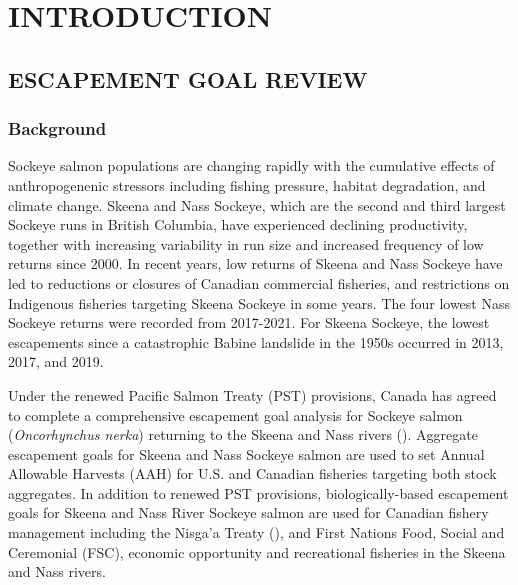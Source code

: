 \documentclass[french,11pt]{book}
\begin{document}
\endgroup{} \endgroup{}

\clearpage

\section{INTRODUCTION}\label{introduction}

\subsection{ESCAPEMENT GOAL REVIEW}\label{Project}

\subsubsection{Background}\label{Background}

Sockeye salmon populations are changing rapidly with the cumulative effects of anthropogenenic stressors including fishing pressure, habitat degradation, and climate change. Skeena and Nass Sockeye, which are the second and third largest Sockeye runs in British Columbia, have experienced declining productivity, together with increasing variability in run size and increased frequency of low returns since 2000. In recent years, low returns of Skeena and Nass Sockeye have led to reductions or closures of Canadian commercial fisheries, and restrictions on Indigenous fisheries targeting Skeena Sockeye in some years. The four lowest Nass Sockeye returns were recorded from 2017-2021. For Skeena Sockeye, the lowest escapements since a catastrophic Babine landslide in the 1950s occurred in 2013, 2017, and 2019.

Under the renewed Pacific Salmon Treaty (PST) provisions, Canada has agreed to complete a comprehensive escapement goal analysis for Sockeye salmon (\emph{Oncorhynchus nerka}) returning to the Skeena and Nass rivers (). Aggregate escapement goals for Skeena and Nass Sockeye salmon are used to set Annual Allowable Harvests (AAH) for U.S. and Canadian fisheries targeting both stock aggregates. In addition to renewed PST provisions, biologically-based escapement goals for Skeena and Nass River Sockeye salmon are used for Canadian fishery management including the Nisga'a Treaty (), and First Nations Food, Social and Ceremonial (FSC), economic opportunity and recreational fisheries in the Skeena and Nass rivers.
\end{document}
